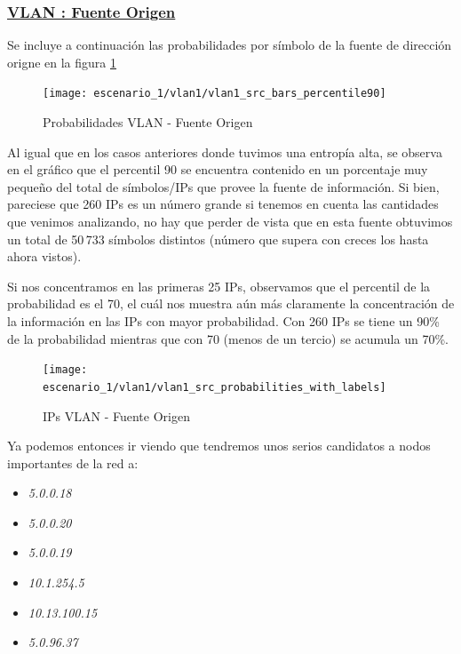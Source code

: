\subsubsection*{\underline{VLAN : Fuente Origen}}\label{subsubsec:vlan1_src}
\par Se incluye a continuaci\'on las probabilidades por s\'imbolo de la fuente de direcci\'on
origne en la figura \ref{fig:vlan1_src_prob_per90}

\begin{figure}[!ht]
    \centering
    \texttt{[image: escenario\_1/vlan1/vlan1\_src\_bars\_percentile90]}
    \caption{Probabilidades VLAN  - Fuente Origen}
    \label{fig:vlan1_src_prob_per90}
\end{figure}

\par Al igual que en los casos anteriores donde tuvimos una entrop\'ia alta, se observa
en el gr\'afico que el percentil 90 se encuentra contenido en un porcentaje muy peque\~no
del total de s\'imbolos/IPs que provee la fuente de informaci\'on. Si bien, pareciese
que 260 IPs es un n\'umero grande si tenemos en cuenta las cantidades que venimos
analizando, no hay que perder de vista que en esta fuente obtuvimos un total de
50\,733 s\'imbolos distintos (n\'umero que supera con creces los hasta ahora vistos).

\par Si nos concentramos en las primeras 25 IPs, observamos que el percentil de la probabilidad
es el 70, el cu\'al nos muestra a\'un m\'as claramente la concentraci\'on de la informaci\'on
en las IPs con mayor probabilidad. Con 260 IPs se tiene un 90\% de la probabilidad mientras
que con 70 (menos de un tercio) se acumula un 70\%.

\begin{figure}[!ht]
    \centering
    \texttt{[image: escenario\_1/vlan1/vlan1\_src\_probabilities\_with\_labels]}
    \caption{IPs VLAN  - Fuente Origen}
    \label{fig:vlan1_src_prob_ips}
\end{figure}

\par Ya podemos entonces ir viendo que tendremos unos serios candidatos a nodos
importantes de la red a:

\begin{itemize}
    \item \textit{5.0.0.18}
    \item \textit{5.0.0.20}
    \item \textit{5.0.0.19}
    \item \textit{10.1.254.5}
    \item \textit{10.13.100.15}
    \item \textit{5.0.96.37}
\end{itemize}


